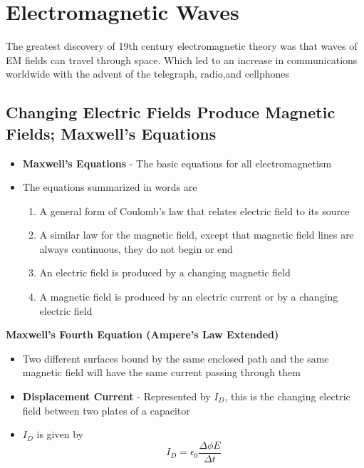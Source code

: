 \section{Electromagnetic Waves}
The greatest discovery of 19th century electromagnetic theory was that waves of EM fields can travel through space. Which led to an increase in communications worldwide with the advent of the telegraph, radio,and cellphones

\subsection{Changing Electric Fields Produce Magnetic Fields; Maxwell's Equations}
\begin{itemize}
    \item \textbf{Maxwell's Equations} - The basic equations for all electromagnetism
    \item The equations summarized in words are 
    \begin{enumerate}
        \item A general form of Coulomb's law that relates electric field to its source
        \item A similar law for the magnetic field, except that magnetic field lines are always continuous, they do not begin or end
        \item An electric field is produced by a changing magnetic field
        \item A magnetic field is produced by an electric current or by a changing electric field
    \end{enumerate}
\end{itemize}

\textbf{Maxwell's Fourth Equation (Ampere's Law Extended)}
\begin{itemize}
    \item Two different surfaces bound by the same enclosed path and the same magnetic field will have the same current passing through them
    \item \textbf{Displacement Current} - Represented by \(I_D\), this is the changing electric field between two plates of a capacitor
    \item \(I_D\) is given by \[I_D=\epsilon_0\frac{\Delta \phi E}{\Delta t}\]
\end{itemize}

